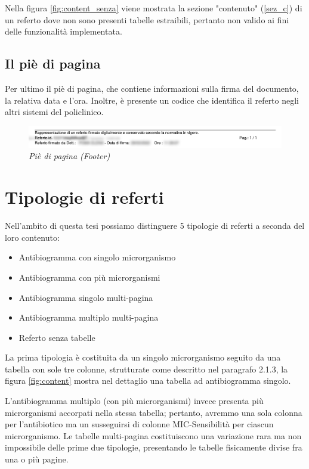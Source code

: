 \newpage
Nella figura \ref{fig:content_senza} viene mostrata la sezione "contenuto" (\ref{sez_c}) di un referto dove non sono presenti tabelle estraibili, pertanto non valido ai fini delle funzionalità implementata.

\subsection{Il piè di pagina}
Per ultimo il piè di pagina, che contiene informazioni sulla firma del documento, la relativa data e l'ora. Inoltre, è presente un codice  che identifica il referto negli altri sistemi del policlinico.
\begin{figure}[h!]
	\centering
	\includegraphics[width=.99\columnwidth]{images/footer.png}
	\caption{\textit{Piè di pagina (Footer)}}
	\label{fig:footer}
\end{figure}
\bigskip
\newpage
\section{Tipologie di referti}
Nell'ambito di questa tesi possiamo distinguere 5 tipologie di referti a seconda del loro contenuto:
\begin{itemize}
	\item Antibiogramma con singolo microrganismo
	\item Antibiogramma con più microrganismi
	\item Antibiogramma singolo multi-pagina
	\item Antibiogramma multiplo multi-pagina
	\item Referto senza tabelle
\end{itemize}
\bigskip
La prima tipologia è costituita da un singolo microrganismo seguito da una tabella con sole tre colonne, strutturate come descritto nel paragrafo 2.1.3, la figura \ref{fig:content} mostra nel dettaglio una tabella ad antibiogramma singolo.
 
L'antibiogramma multiplo (con più microrganismi) invece presenta più microrganismi accorpati nella stessa tabella; pertanto, avremmo una sola colonna per l'antibiotico ma un susseguirsi di colonne MIC-Sensibilità per ciascun microrganismo.
Le tabelle multi-pagina costituiscono una variazione rara ma non impossibile delle prime due tipologie, presentando le tabelle fisicamente divise fra una o più pagine.
\newpage
